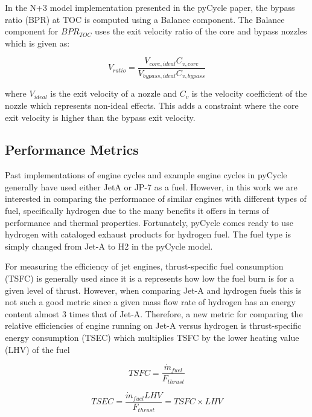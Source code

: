 \documentclass[conf]{new-aiaa}
\begin{document}
In the N+3 model implementation presented in the pyCycle paper, the bypass ratio (BPR) at TOC is computed using a Balance component.
The Balance component for $BPR_{TOC}$ uses the exit velocity ratio of the core and bypass nozzles which is given as:

\begin{equation}
    V_{ratio} = \frac{V_{core,ideal}C_{v,core}}{V_{bypass,ideal}C_{v,bypass}}
\end{equation}

\noindent
where $V_{ideal}$ is the exit velocity of a nozzle and $C_v$ is the velocity coefficient of the nozzle which represents non-ideal effects.
This adds a constraint where the core exit velocity is higher than the bypass exit velocity.

\subsection{Performance Metrics}
Past implementations of engine cycles and example engine cycles in pyCycle generally have used either JetA or JP-7 as a fuel.
However, in this work we are interested in comparing the performance of similar engines with different types of fuel, specifically hydrogen due to the many benefits it offers in terms of performance and thermal properties.
Fortunately, pyCycle comes ready to use hydrogen with cataloged exhaust products for hydrogen fuel.
The fuel type is simply changed from Jet-A to H2 in the pyCycle model.

For measuring the efficiency of jet engines, thrust-specific fuel consumption (TSFC) is generally used since it is a represents how low the fuel burn is for a given level of thrust.
However, when comparing Jet-A and hydrogen fuels this is not such a good metric since a given mass flow rate of hydrogen has an energy content almost 3 times that of Jet-A.
Therefore, a new metric for comparing the relative efficiencies of engine running on Jet-A versus hydrogen is thrust-specific energy consumption (TSEC) which multiplies TSFC by the lower heating value (LHV) of the fuel %

\begin{equation}
    TSFC = \frac{\Dot{m}_{fuel}}{F_{thrust}}
\end{equation}

\begin{equation}
    TSEC = \frac{\Dot{m}_{fuel} LHV}{F_{thrust}} = TSFC \times LHV
\end{equation}
\end{document}
